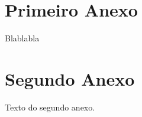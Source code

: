 \begin{anexosenv}

\partanexos

\chapter{Primeiro Anexo}

Blablabla

\chapter{Segundo Anexo}

Texto do segundo anexo.

\end{anexosenv}

